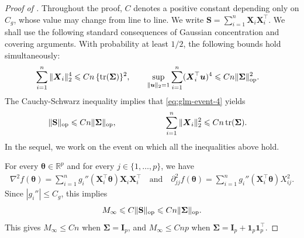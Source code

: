 \documentclass[aos,reqno]{imsart}
\newcommand\bfS{\mathbf S}
\newcommand\bX{\boldsymbol X}
\newcommand\bu{\boldsymbol u}
\newcommand\btheta{\boldsymbol\theta}
\newcommand\bSigma{\boldsymbol\Sigma}
\def\Mmax{M_{\infty}}
\theoremstyle{definition}
\begin{document}
\begin{proof}[Proof of ]
Throughout the proof, $C$ denotes a positive constant
depending only on $C_g$, whose value may change from 
line to line. We write $\bfS = \sum_{i=1}^n \bX_i
\bX_i^\top$. We shall use the following standard 
consequences of Gaussian concentration and covering 
arguments. With probability at least $1/2$, the 
following bounds hold simultaneously:
\begin{align}
    \sum_{i=1}^n\|\bX_i\|_2^4
    &\leqslant  Cn\,\{{\rm tr}(\bSigma)\}^2,
    \qquad
    \sup_{\|\bu\|_2=1}
    \sum_{i=1}^n(\bX_i^\top\bu)^4
    \leqslant  Cn\|\bSigma\|_{\rm op}^2 .
    \label{eq:glm-event-4}
\end{align}
The Cauchy-Schwarz inequality implies that 
\eqref{eq:glm-event-4} yields
\begin{align}\label{eq:glm-event-1}
    \|\bfS\|_{\rm op}
    &\leqslant  Cn\|\bSigma\|_{\rm op},
    \qquad\qquad\qquad
    \sum_{i=1}^n\|\bX_i\|_2^2
    \leqslant  Cn\,{\rm tr}(\bSigma).
\end{align}
In the sequel, we work on the event on which all
the inequalities above hold.

For every $\btheta\in\mathbb R^p$ and for every 
$j \in\{1,\ldots,p\}$, we have
\begin{align}\label{eq:f''}
    \nabla^2 f(\btheta) = \sum_{i=1}^n
    g_i''(\bX_i^\top\btheta)\bX_i\bX_i^\top 
    \quad\text{and}\quad 
    \partial_{jj}^2 f(\btheta) = \sum_{i=1}^n
    g_i''(\bX_i^\top\btheta)X_{ij}^2. 
\end{align}
Since $|g_i''|\leqslant  C_g$, this 
implies
\begin{align}
    \Mmax \leqslant  C\|\bfS\|_{\rm op}
    \leqslant  Cn\|\bSigma\|_{\rm op}.
    \label{eq:glm-Mmax}
\end{align}
This gives $\Mmax\leqslant Cn$ when $\bSigma=\mathbf I_p$,
and $\Mmax\leqslant Cnp$ when
$\bSigma=\mathbf I_p+\mathbf 1_p\mathbf 1_p^\top$.


\end{proof}
\end{document}
